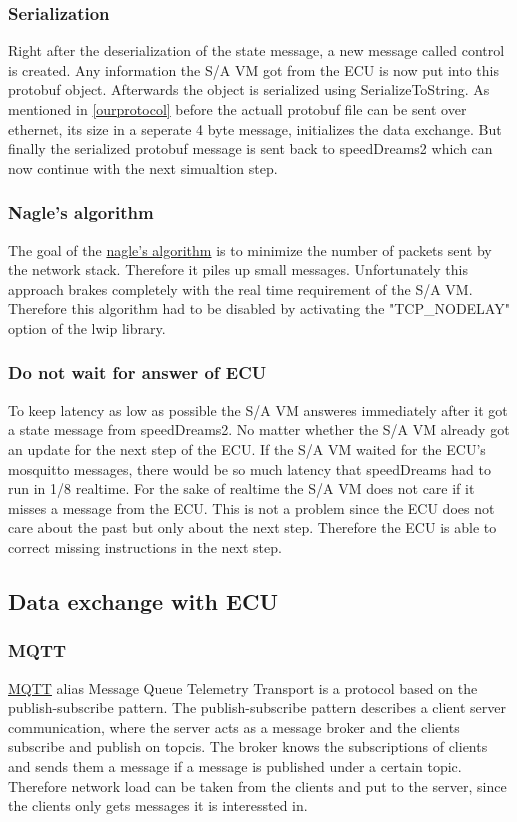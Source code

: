 \documentclass[paper=a4, fontsize=11pt]{scrartcl}
\begin{document}
  \subsubsection{Serialization}
Right after the deserialization of the state message, a new message called control is created. Any information the S/A VM got from the ECU is now put into this protobuf object. Afterwards the object is serialized using SerializeToString. As mentioned in \ref{ourprotocol} before the actuall protobuf file can be sent over ethernet, its size in a seperate 4 byte message, initializes the data exchange. But finally the serialized protobuf message is sent back to speedDreams2 which can now continue with the next simualtion step.
  \subsubsection{Nagle's algorithm}
The goal of the \href{https://www.lifewire.com/nagle-algorithm-for-tcp-network-communication-817932}{nagle's algorithm} is to minimize the number of packets sent by the network stack. Therefore it piles up small messages. Unfortunately this approach brakes completely with the real time requirement of the S/A VM. Therefore this algorithm had to be disabled by activating the "TCP\_NODELAY" option of the lwip library.
  \subsubsection{Do not wait for answer of ECU}
To keep latency as low as possible the S/A VM answeres immediately after it got a state message from speedDreams2. No matter whether the S/A VM already got an update for the next step of the ECU. If the S/A VM waited for the ECU's mosquitto messages, there would be so much latency that speedDreams had to run in 1/8 realtime. For the sake of realtime the S/A VM does not care if it misses a message from the ECU. This is not a problem since the ECU does not care about the past but only about the next step. Therefore the ECU is able to correct missing instructions in the next step.
\newpage
\subsection{Data exchange with ECU}
  \subsubsection{MQTT}
\href{http://mqtt.org/}{MQTT} alias Message Queue Telemetry Transport is a protocol based on the publish-subscribe pattern.\newline
The publish-subscribe pattern describes a client server communication, where the server acts as a message broker and the clients subscribe and publish on topcis. The broker knows the subscriptions of clients and sends them a message if a message is published under a certain topic. Therefore network load can be taken from the clients and put to the server, since the clients only gets messages it is interessted in.
\end{document}
